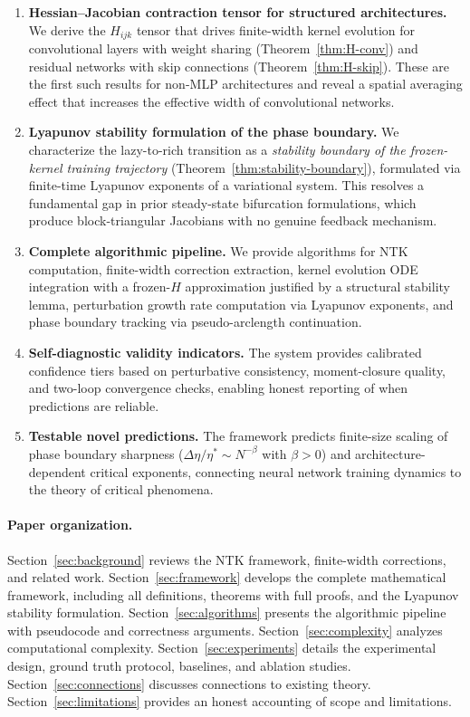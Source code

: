 \documentclass[11pt]{article}
\theoremstyle{definition}
\begin{document}
\begin{enumerate}[leftmargin=*,itemsep=2pt]
\item \textbf{Hessian--Jacobian contraction tensor for structured architectures.} We derive the $H_{ijk}$ tensor that drives finite-width kernel evolution for convolutional layers with weight sharing (Theorem~\ref{thm:H-conv}) and residual networks with skip connections (Theorem~\ref{thm:H-skip}). These are the first such results for non-MLP architectures and reveal a spatial averaging effect that increases the effective width of convolutional networks.

\item \textbf{Lyapunov stability formulation of the phase boundary.} We characterize the lazy-to-rich transition as a \emph{stability boundary of the frozen-kernel training trajectory} (Theorem~\ref{thm:stability-boundary}), formulated via finite-time Lyapunov exponents of a variational system. This resolves a fundamental gap in prior steady-state bifurcation formulations, which produce block-triangular Jacobians with no genuine feedback mechanism.

\item \textbf{Complete algorithmic pipeline.} We provide algorithms for NTK computation, finite-width correction extraction, kernel evolution ODE integration with a frozen-$H$ approximation justified by a structural stability lemma, perturbation growth rate computation via Lyapunov exponents, and phase boundary tracking via pseudo-arclength continuation.

\item \textbf{Self-diagnostic validity indicators.} The system provides calibrated confidence tiers based on perturbative consistency, moment-closure quality, and two-loop convergence checks, enabling honest reporting of when predictions are reliable.

\item \textbf{Testable novel predictions.} The framework predicts finite-size scaling of phase boundary sharpness ($\Delta\eta/\eta^* \sim N^{-\beta}$ with $\beta > 0$) and architecture-dependent critical exponents, connecting neural network training dynamics to the theory of critical phenomena.
\end{enumerate}

\paragraph{Paper organization.} Section~\ref{sec:background} reviews the NTK framework, finite-width corrections, and related work. Section~\ref{sec:framework} develops the complete mathematical framework, including all definitions, theorems with full proofs, and the Lyapunov stability formulation. Section~\ref{sec:algorithms} presents the algorithmic pipeline with pseudocode and correctness arguments. Section~\ref{sec:complexity} analyzes computational complexity. Section~\ref{sec:experiments} details the experimental design, ground truth protocol, baselines, and ablation studies. Section~\ref{sec:connections} discusses connections to existing theory. Section~\ref{sec:limitations} provides an honest accounting of scope and limitations.
\end{document}
